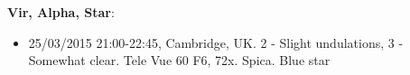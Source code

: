{\bf Vir, Alpha, Star}:
\begin{itemize}
\item 25/03/2015 21:00-22:45, Cambridge, UK. 2 - Slight undulations, 3 - Somewhat clear. Tele Vue 60 F6, 72x. Spica. Blue star
\end{itemize}
